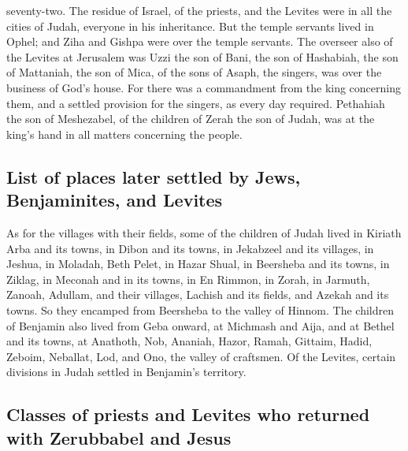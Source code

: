 seventy-two.  The residue of Israel, of the priests, and
the Levites were in all the cities of Judah, everyone in his
inheritance.  But the temple servants lived in Ophel; and
Ziha and Gishpa were over the temple servants.  The
overseer also of the Levites at Jerusalem was Uzzi the son of Bani, the
son of Hashabiah, the son of Mattaniah, the son of Mica, of the sons of
Asaph, the singers, was over the business of God's house.
 For there was a commandment from the king concerning
them, and a settled provision for the singers, as every day required.
 Pethahiah the son of Meshezabel, of the children of
Zerah the son of Judah, was at the king's hand in all matters concerning
the people.

\hypertarget{list-of-places-later-settled-by-jews-benjaminites-and-levites}{%
\subsection{List of places later settled by Jews, Benjaminites, and
Levites}\label{list-of-places-later-settled-by-jews-benjaminites-and-levites}}

 As for the villages with their fields, some of the
children of Judah lived in Kiriath Arba and its towns, in Dibon and its
towns, in Jekabzeel and its villages,  in Jeshua, in
Moladah, Beth Pelet,  in Hazar Shual, in Beersheba and
its towns,  in Ziklag, in Meconah and in its towns,
 in En Rimmon, in Zorah, in Jarmuth, 
Zanoah, Adullam, and their villages, Lachish and its fields, and Azekah
and its towns. So they encamped from Beersheba to the valley of Hinnom.
 The children of Benjamin also lived from Geba onward, at
Michmash and Aija, and at Bethel and its towns,  at
Anathoth, Nob, Ananiah,  Hazor, Ramah, Gittaim,
 Hadid, Zeboim, Neballat,  Lod, and Ono,
the valley of craftsmen.  Of the Levites, certain
divisions in Judah settled in Benjamin's territory.

\hypertarget{classes-of-priests-and-levites-who-returned-with-zerubbabel-and-jesus}{%
\subsection{Classes of priests and Levites who returned with Zerubbabel
and
Jesus}\label{classes-of-priests-and-levites-who-returned-with-zerubbabel-and-jesus}}

